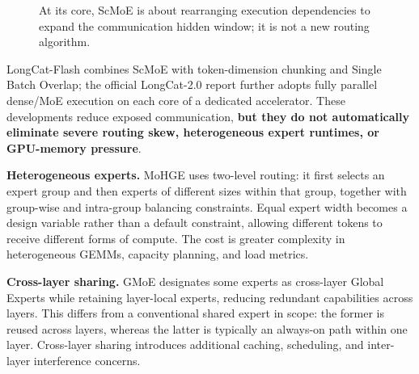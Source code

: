 \documentclass[10pt,a4paper,fontset=none]{ctexart}
\begin{document}
\begin{figure}[htbp]
\centering
{}
\caption{At its core, ScMoE is about rearranging execution dependencies to expand the communication hidden window; it is not a new routing algorithm.}
\label{en:fig:scmoe}
\end{figure}

LongCat-Flash combines ScMoE with token-dimension chunking and Single Batch Overlap; the official LongCat-2.0 report further adopts fully parallel dense/MoE execution on each core of a dedicated accelerator\cite{en:longcat2}. These developments reduce exposed communication, \textbf{but they do not automatically eliminate severe routing skew, heterogeneous expert runtimes, or GPU-memory pressure}.

\textbf{Heterogeneous experts.} MoHGE uses two-level routing: it first selects an expert group and then experts of different sizes within that group, together with group-wise and intra-group balancing constraints\cite{en:mohge2026}. Equal expert width becomes a design variable rather than a default constraint, allowing different tokens to receive different forms of compute. The cost is greater complexity in heterogeneous GEMMs, capacity planning, and load metrics.

\textbf{Cross-layer sharing.} GMoE designates some experts as cross-layer Global Experts while retaining layer-local experts, reducing redundant capabilities across layers\cite{en:gmoe2026}. This differs from a conventional shared expert in scope: the former is reused across layers, whereas the latter is typically an always-on path within one layer. Cross-layer sharing introduces additional caching, scheduling, and inter-layer interference concerns.
\end{document}

